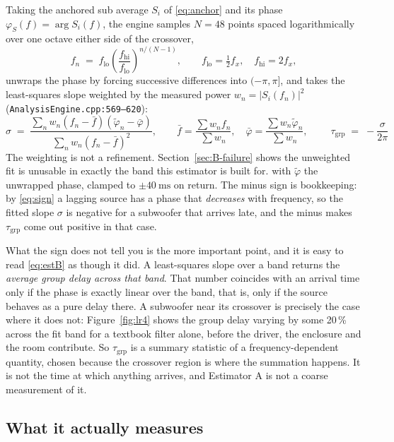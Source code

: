 \documentclass[11pt,a4paper]{article}
\newcommand{\srcref}[2]{\texttt{\small #1}\discretionary{}{}{}\texttt{\small :#2}}
\begin{document}
Taking the anchored sub average $S_i$ of \eqref{eq:anchor} and its phase
$\varphi_S(f) = \arg S_i(f)$, the engine samples $N = 48$ points spaced
logarithmically over one octave either side of the crossover,
%
\begin{equation}
  f_n \;=\; f_{\mathrm{lo}} \left(\frac{f_{\mathrm{hi}}}{f_{\mathrm{lo}}}\right)^{\!\!n/(N-1)},
  \qquad
  f_{\mathrm{lo}} = \tfrac{1}{2} f_x, \quad f_{\mathrm{hi}} = 2 f_x,
\end{equation}
%
unwraps the phase by forcing successive differences into $(-\pi, \pi]$, and takes
the least-squares slope weighted by the measured power
$w_n = |S_i(f_n)|^2$ (\srcref{AnalysisEngine.cpp}{569--620}):
%
\begin{equation}
  \sigma \;=\;
  \frac{\sum_n w_n (f_n - \bar f)(\tilde\varphi_n - \bar\varphi)}
       {\sum_n w_n (f_n - \bar f)^2},
  \qquad
  \bar f = \frac{\sum w_n f_n}{\sum w_n}, \quad
  \bar\varphi = \frac{\sum w_n \tilde\varphi_n}{\sum w_n},
  \qquad
  \boxed{\;\tau_{\mathrm{grp}} \;=\; -\frac{\sigma}{2\pi}\;}
  \label{eq:estB}
\end{equation}
%
The weighting is not a refinement. Section~\ref{sec:B-failure} shows the
unweighted fit is unusable in exactly the band this estimator is built for.
%
with $\tilde\varphi$ the unwrapped phase, clamped to $\pm\SI{40}{\milli\second}$
on return. The minus sign is bookkeeping: by \eqref{eq:sign} a lagging source
has a phase that \emph{decreases} with frequency, so the fitted slope $\sigma$
is negative for a subwoofer that arrives late, and the minus makes
$\tau_{\mathrm{grp}}$ come out positive in that case.

What the sign does not tell you is the more important point, and it is easy to
read \eqref{eq:estB} as though it did. A least-squares slope over a band returns
the \emph{average group delay across that band}. That number coincides with an
arrival time only if the phase is exactly linear over the band, that is, only
if the source behaves as a pure delay there. A subwoofer near its crossover is
precisely the case where it does not: Figure~\ref{fig:lr4} shows the group delay
varying by some 20\,\% across the fit band for a textbook filter alone, before
the driver, the enclosure and the room contribute. So $\tau_{\mathrm{grp}}$ is a
summary statistic of a frequency-dependent quantity, chosen because the
crossover region is where the summation happens. It is not the time at which
anything arrives, and Estimator A is not a coarse measurement of it.

\subsection{What it actually measures}
\end{document}
